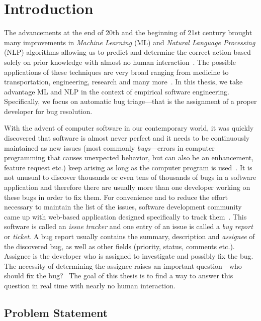 \chapter{Introduction}

The advancements at the end of 20th and the beginning of 21st century brought many improvements in \textit{Machine Learning} (ML) and \textit{Natural Language Processing} (NLP) algorithms allowing us to predict and determine the correct action based solely on prior knowledge with almost no human interaction~\cite{carbonell1983overview}. The possible applications of these techniques are very broad ranging from medicine to transportation, engineering, research and many more~\cite{kononenko2001machine}\cite{nguyen1990neural}. In this thesis, we take advantage ML and NLP in the context of empirical software engineering. Specifically, we focus on automatic bug triage---that is the assignment of a proper developer for bug resolution.

With the advent of computer software in our contemporary world, it was quickly discovered that software is almost never perfect and it needs to be continuously maintained as new issues (most commonly \textit{bugs}---errors in computer programming that causes unexpected behavior, but can also be an enhancement, feature request etc.) keep arising as long as the computer program is used~\cite{nist2002}. It is not unusual to discover thousands or even tens of thousands of bugs in a software application and therefore there are usually more than one developer working on these bugs in order to fix them. For convenience and to reduce the effort necessary to maintain the list of the issues, software development community came up with web-based application designed specifically to track them~\cite{bertram2010communication}. This software is called an \textit{issue tracker} and one entry of an issue is called a \textit{bug report} or \textit{ticket}. A bug report usually contains the summary, description and \textit{assignee} of the discovered bug, as well as other fields (priority, status, comments etc.). Assignee is the developer who is assigned to investigate and possibly fix the bug. The necessity of determining the assignee raises an important question---who should fix the bug?~\cite{Anvik2006} The goal of this thesis is to find a way to answer this question in real time with nearly no human interaction.

\section{Problem Statement}

